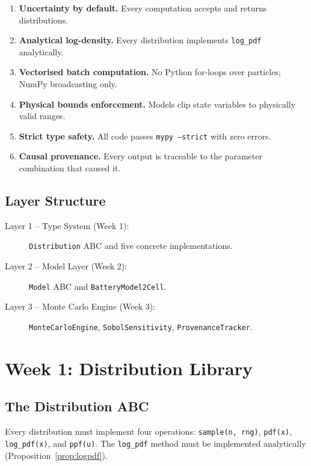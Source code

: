 \documentclass[12pt,a4paper]{article}
\theoremstyle{plain}
\theoremstyle{definition}
\theoremstyle{remark}
\begin{document}
\begin{enumerate}
  \item \textbf{Uncertainty by default.}
    Every computation accepts and returns distributions.
  \item \textbf{Analytical log-density.}
    Every distribution implements \texttt{log\_pdf} analytically.
  \item \textbf{Vectorised batch computation.}
    No Python for-loops over particles; NumPy broadcasting only.
  \item \textbf{Physical bounds enforcement.}
    Models clip state variables to physically valid ranges.
  \item \textbf{Strict type safety.}
    All code passes \texttt{mypy --strict} with zero errors.
  \item \textbf{Causal provenance.}
    Every output is traceable to the parameter combination that caused it.
\end{enumerate}

\subsection{Layer Structure}

\begin{description}
  \item[Layer 1 -- Type System (Week 1):]
    \texttt{Distribution} ABC and five concrete implementations.
  \item[Layer 2 -- Model Layer (Week 2):]
    \texttt{Model} ABC and \texttt{BatteryModel2Cell}.
  \item[Layer 3 -- Monte Carlo Engine (Week 3):]
    \texttt{MonteCarloEngine}, \texttt{SobolSensitivity},
    \texttt{ProvenanceTracker}.
\end{description}

\section{Week 1: Distribution Library}

\subsection{The Distribution ABC}

Every distribution must implement four operations:
\texttt{sample(n, rng)}, \texttt{pdf(x)}, \texttt{log\_pdf(x)},
and \texttt{ppf(u)}.
The \texttt{log\_pdf} method must be implemented analytically
(Proposition~\ref{prop:logpdf}).
\end{document}
